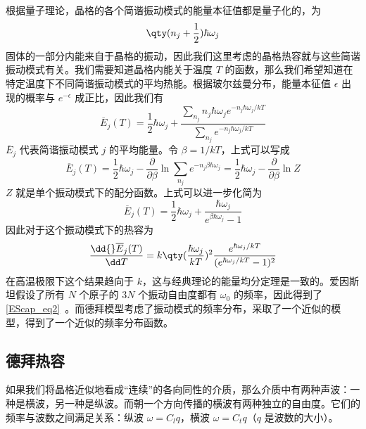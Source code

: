 

根据量子理论，晶格的各个简谐振动模式的能量本征值都是量子化的，为
\begin{equation}
\qty(n_j+\frac{1}{2})\hbar \omega_j
\end{equation}
固体的一部分内能来自于晶格的振动，因此我们这里考虑的晶格热容就与这些简谐振动模式有关。我们需要知道晶格内能关于温度 $T$ 的函数，那么我们希望知道在特定温度下不同简谐振动模式的平均热能。根据玻尔兹曼分布，能量本征值 $\epsilon$ 出现的概率与 $e^{-\epsilon}$ 成正比，因此我们有
\begin{equation}
\overline E_j(T)=\frac{1}{2}\hbar \omega_j + \frac{\sum_{n_j} n_j\hbar \omega_j e^{-n_j \hbar \omega_j / kT}}{\sum_{n_j} e^{-n_j \hbar \omega_j / kT}}
\end{equation}
$\overline E_j$ 代表简谐振动模式 $j$ 的平均能量。令 $\beta=1/kT$，上式可以写成
\begin{equation}
\overline E_j(T)=\frac{1}{2}\hbar \omega_j - \frac{\partial}{\partial \beta} \ln \sum_{n_j} e^{-n_j\beta\hbar\omega_j}=\frac{1}{2}\hbar \omega_j - \frac{\partial}{\partial \beta} \ln Z
\end{equation}
$Z$ 就是单个振动模式下的配分函数。上式可以进一步化简为
\begin{equation}
\overline E_j(T)=\frac{1}{2}\hbar \omega_j + \frac{\hbar \omega_j}{e^{\beta\hbar\omega_j}-1}
\end{equation}
因此对于这个振动模式下的热容为
\begin{equation}
\frac{\dd{} \overline E_j(T)}{\dd T}=k \qty(\frac{\hbar\omega_j}{kT})^2\frac{e^{\hbar \omega_j/kT}}{(e^{\hbar\omega_j/kT}-1)^2}
\end{equation}
在高温极限下这个结果趋向于 $k$，这与经典理论的能量均分定理是一致的。爱因斯坦假设了所有 $N$ 个原子的 $3N$ 个振动自由度都有 $\omega_0$ 的频率，因此得到了\autoref{EScap_eq2}~。而德拜模型考虑了振动模式的频率分布，采取了一个近似的模型，得到了一个近似的频率分布函数。

\subsection{德拜热容}
如果我们将晶格近似地看成“连续”的各向同性的介质，那么介质中有两种声波：一种是横波，另一种是纵波。而朝一个方向传播的横波有两种独立的自由度。它们的频率与波数之间满足关系：纵波 $\omega=C_l q$，横波 $\omega=C_t q$（$q$ 是波数的大小）。

